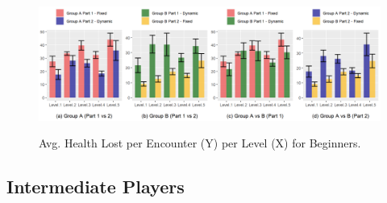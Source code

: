 \begin{figure}[!ht]
    \begin{center}
    \caption{Avg. Health Lost per Encounter (Y) per Level (X) for Beginners.}
        \includegraphics[width=34em]{figures/health_lost_per_encounter-beginner_players.png}
        \label{fig:result-metric-beginners-health-lost-per-encounter}
    \end{center}
\end{figure}


\subsection{Intermediate Players}



